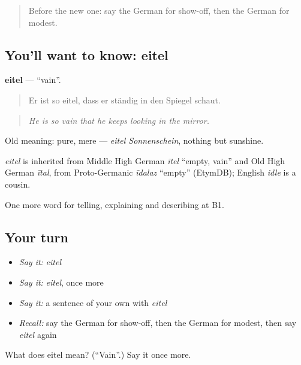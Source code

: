 \begin{quote}
Before the new one: say the German for show-off, then the German for modest.
\end{quote}

\subsection*{You'll want to know: eitel}
\textbf{eitel} — \textquotedblleft{}vain\textquotedblright{}.

\begin{quote}
Er ist so eitel, dass er ständig in den Spiegel schaut.
\end{quote}

\begin{quote}
\emph{He is so vain that he keeps looking in the mirror.}
\end{quote}

Old meaning: pure, mere — \emph{eitel Sonnenschein}, nothing but sunshine.

\begin{cousinweb}
\emph{eitel} is inherited from Middle High German \emph{ītel} \textquotedblleft{}empty, vain\textquotedblright{} and Old High German \emph{ītal}, from Proto-Germanic \emph{īdalaz} \textquotedblleft{}empty\textquotedblright{} (EtymDB); English \emph{idle} is a cousin.
\end{cousinweb}

\begin{grammarlens}[title={What you've built}]
One more word for telling, explaining and describing at B1.
\end{grammarlens}

\subsection*{Your turn}
\begin{itemize}
\raggedright
  \item \emph{Say it:} \emph{eitel}
  \item \emph{Say it:} \emph{eitel}, once more
  \item \emph{Say it:} a sentence of your own with \emph{eitel}
  \item \emph{Recall:} say the German for show-off, then the German for modest, then say \emph{eitel} again
\end{itemize}

\begin{tcolorbox}[breakable,colback=teal!4,colframe=teal!35!black,title={Before you move on}]
What does eitel mean? (\textquotedblleft{}Vain\textquotedblright{}.) Say it once more.
\end{tcolorbox}
